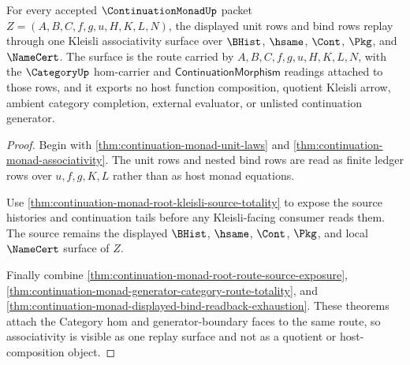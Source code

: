 \begin{theorem}
\label{thm:continuation-monad-root-kleisli-associativity-surface}
For every accepted $\ContinuationMonadUp$ packet $Z=(A,B,C,f,g,u,H,K,L,N)$, the displayed unit rows and bind rows replay through one Kleisli associativity surface over $\BHist$, $\hsame$, $\Cont$, $\Pkg$, and $\NameCert$. The surface is the route carried by $A,B,C,f,g,u,H,K,L,N$, with the $\CategoryUp$ hom-carrier and $\mathsf{ContinuationMorphism}$ readings attached to those rows, and it exports no host function composition, quotient Kleisli arrow, ambient category completion, external evaluator, or unlisted continuation generator.
\end{theorem}
\begin{proof}
Begin with \autoref{thm:continuation-monad-unit-laws} and \autoref{thm:continuation-monad-associativity}. The unit rows and nested bind rows are read as finite ledger rows over $u,f,g,K,L$ rather than as host monad equations.

Use \autoref{thm:continuation-monad-root-kleisli-source-totality} to expose the source histories and continuation tails before any Kleisli-facing consumer reads them. The source remains the displayed $\BHist$, $\hsame$, $\Cont$, $\Pkg$, and local $\NameCert$ surface of $Z$.

Finally combine \autoref{thm:continuation-monad-root-route-source-exposure}, \autoref{thm:continuation-monad-generator-category-route-totality}, and \autoref{thm:continuation-monad-displayed-bind-readback-exhaustion}. These theorems attach the Category hom and generator-boundary faces to the same route, so associativity is visible as one replay surface and not as a quotient or host-composition object.
\end{proof}

